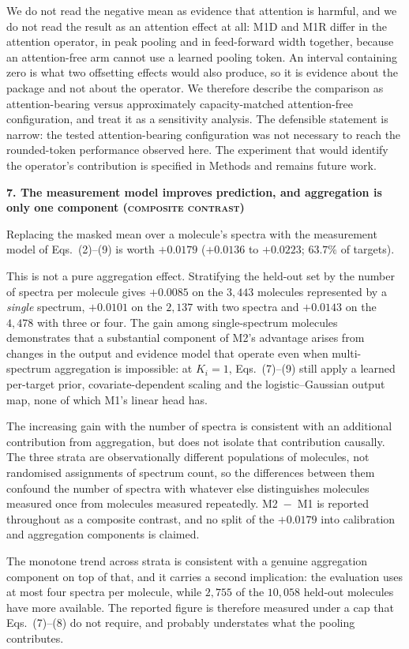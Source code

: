 \documentclass[11pt]{article}
\makeatletter
\newcommand{\hdlab}[2]{\def\@currentlabel{#1}\label{#2}}
\newcommand{\hd}[1]{\medskip\par\noindent\textbf{#1}\par\nobreak\vspace{2pt}\noindent\ignorespaces}
\newcommand{\composite}{{\normalfont\scshape composite contrast}}
\makeatother
\begin{document}
We do not read the negative mean as evidence that attention is harmful, and we do not read the result as an attention effect at all: M1D and M1R differ in the attention operator, in peak pooling and in feed-forward width together, because an attention-free arm cannot use a learned pooling token. An interval containing zero is what two offsetting effects would also produce, so it is evidence about the package and not about the operator. We therefore describe the comparison as attention-bearing versus approximately capacity-matched attention-free configuration, and treat it as a sensitivity analysis. The defensible statement is narrow: the tested attention-bearing configuration was not necessary to reach the rounded-token performance observed here. The experiment that would identify the operator's contribution is specified in Methods and remains future work.

\hd{7. The measurement model improves prediction, and aggregation is only one component (\composite)}
\hdlab{7}{sec:agg}
Replacing the masked mean over a molecule's spectra with the measurement model of Eqs.~(2)--(9) is worth $+0.0179$ ($+0.0136$ to $+0.0223$; $63.7\%$ of targets).

This is not a pure aggregation effect. Stratifying the held-out set by the number
of spectra per molecule gives $+0.0085$ on the $3{,}443$ molecules represented by a
\emph{single} spectrum, $+0.0101$ on the $2{,}137$ with two spectra and $+0.0143$ on
the $4{,}478$ with three or four. The gain among single-spectrum molecules
demonstrates that a substantial component of M2's advantage arises from changes in
the output and evidence model that operate even when multi-spectrum aggregation is
impossible: at $K_i=1$, Eqs.~(7)--(9) still apply a learned per-target prior,
covariate-dependent scaling and the logistic--Gaussian output map, none of which
M1's linear head has.

The increasing gain with the number of spectra is consistent with an additional
contribution from aggregation, but does not isolate that contribution causally. The
three strata are observationally different populations of molecules, not randomised
assignments of spectrum count, so the differences between them confound the number
of spectra with whatever else distinguishes molecules measured once from molecules
measured repeatedly. M2~$-$~M1 is reported throughout as a composite contrast, and
no split of the $+0.0179$ into calibration and aggregation components is claimed.

The monotone trend across strata is consistent with a genuine aggregation component
on top of that, and it carries a second implication: the evaluation uses at most
four spectra per molecule, while $2{,}755$ of the $10{,}058$ held-out molecules have
more available. The reported figure is therefore measured under a cap that
Eqs.~(7)--(8) do not require, and probably understates what the pooling contributes.
\end{document}
